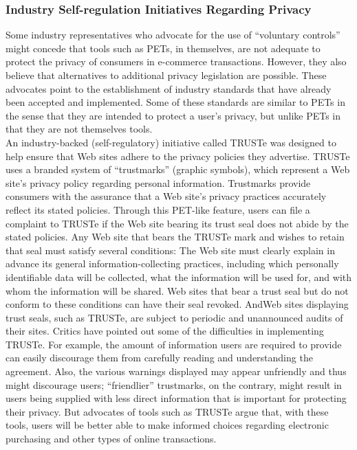 \documentclass[12pt]{article}
\theoremstyle{definition}
\begin{document}
\subsubsection{Industry Self-regulation Initiatives Regarding Privacy}
Some industry representatives who advocate for the use of “voluntary controls” might
concede that tools such as PETs, in themselves, are not adequate to protect the privacy of
consumers in e-commerce transactions. However, they also believe that alternatives to
additional privacy legislation are possible. These advocates point to the establishment of
industry standards that have already been accepted and implemented. Some of these
standards are similar to PETs in the sense that they are intended to protect a user’s
privacy, but unlike PETs in that they are not themselves tools.\\
An industry-backed (self-regulatory) initiative called TRUSTe was designed to
help ensure that Web sites adhere to the privacy policies they advertise. TRUSTe uses
a branded system of “trustmarks” (graphic symbols), which represent a Web site’s
privacy policy regarding personal information. Trustmarks provide consumers with the
assurance that a Web site’s privacy practices accurately reflect its stated policies.
Through this PET-like feature, users can file a complaint to TRUSTe if the Web site
bearing its trust seal does not abide by the stated policies. Any Web site that bears the
TRUSTe mark and wishes to retain that seal must satisfy several conditions: The Web
site must clearly explain in advance its general information-collecting practices,
including which personally identifiable data will be collected, what the information
will be used for, and with whom the information will be shared. Web sites that bear a
trust seal but do not conform to these conditions can have their seal revoked. AndWeb
sites displaying trust seals, such as TRUSTe, are subject to periodic and unannounced
audits of their sites.
Critics have pointed out some of the difficulties in implementing TRUSTe. For
example, the amount of information users are required to provide can easily discourage
them from carefully reading and understanding the agreement. Also, the various
warnings displayed may appear unfriendly and thus might discourage users; “friendlier”
trustmarks, on the contrary, might result in users being supplied with less direct
information that is important for protecting their privacy. But advocates of tools such
as TRUSTe argue that, with these tools, users will be better able to make informed
choices regarding electronic purchasing and other types of online transactions.\\
\end{document}
